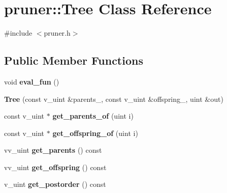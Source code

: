 \hypertarget{classpruner_1_1Tree}{}\section{pruner\+:\+:Tree Class Reference}
\label{classpruner_1_1Tree}


{\ttfamily \#include $<$pruner.\+h$>$}

\subsection*{Public Member Functions}
\begin{DoxyCompactItemize}
\item 
void {\bfseries eval\+\_\+fun} ()\hypertarget{classpruner_1_1Tree_abaa9ef6d7eacf37302d29c12c2180c3a}{}\label{classpruner_1_1Tree_abaa9ef6d7eacf37302d29c12c2180c3a}

\item 
{\bfseries Tree} (const v\+\_\+uint \&parents\+\_\+, const v\+\_\+uint \&offspring\+\_\+, uint \&out)\hypertarget{classpruner_1_1Tree_a0f964d9ba9834822d3e18946a5361839}{}\label{classpruner_1_1Tree_a0f964d9ba9834822d3e18946a5361839}

\item 
const v\+\_\+uint $\ast$ {\bfseries get\+\_\+parents\+\_\+of} (uint i)\hypertarget{classpruner_1_1Tree_a63ce508227afee3535e6ebc1bf864ab1}{}\label{classpruner_1_1Tree_a63ce508227afee3535e6ebc1bf864ab1}

\item 
const v\+\_\+uint $\ast$ {\bfseries get\+\_\+offspring\+\_\+of} (uint i)\hypertarget{classpruner_1_1Tree_aa1cb5b73d8071e8c5b8be1ec29b54519}{}\label{classpruner_1_1Tree_aa1cb5b73d8071e8c5b8be1ec29b54519}

\item 
vv\+\_\+uint {\bfseries get\+\_\+parents} () const \hypertarget{classpruner_1_1Tree_af6fc180708707649aea726520e0380dd}{}\label{classpruner_1_1Tree_af6fc180708707649aea726520e0380dd}

\item 
vv\+\_\+uint {\bfseries get\+\_\+offspring} () const \hypertarget{classpruner_1_1Tree_a6e4c504b4cb062572f0e2be0ae9d78f2}{}\label{classpruner_1_1Tree_a6e4c504b4cb062572f0e2be0ae9d78f2}

\item 
v\+\_\+uint {\bfseries get\+\_\+postorder} () const \hypertarget{classpruner_1_1Tree_a6b3a01f3e0b29522341fe5ba59117471}{}\label{classpruner_1_1Tree_a6b3a01f3e0b29522341fe5ba59117471}


\end{DoxyCompactItemize}
